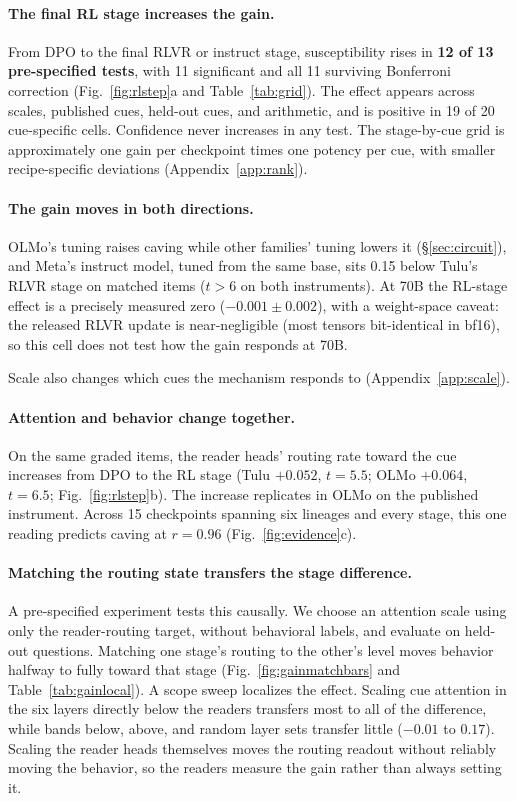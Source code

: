 \documentclass{article}
\begin{document}
\paragraph{The final RL stage increases the gain.} From DPO to the final RLVR or instruct stage, susceptibility rises in \textbf{12 of 13 pre-specified tests}, with 11 significant and all 11 surviving Bonferroni correction (Fig.~\ref{fig:rlstep}a and Table~\ref{tab:grid}). The effect appears across scales, published cues, held-out cues, and arithmetic, and is positive in 19 of 20 cue-specific cells. Confidence never increases in any test. The stage-by-cue grid is approximately one gain per checkpoint times one potency per cue, with smaller recipe-specific deviations (Appendix~\ref{app:rank}).

\paragraph{The gain moves in both directions.} OLMo's tuning raises caving while other families' tuning lowers it (\S\ref{sec:circuit}), and Meta's instruct model, tuned from the same base, sits 0.15 below Tulu's RLVR stage on matched items ($t>6$ on both instruments). At 70B the RL-stage effect is a precisely measured zero ($-0.001\pm0.002$), with a weight-space caveat: the released RLVR update is near-negligible (most tensors bit-identical in bf16), so this cell does not test how the gain responds at 70B.

Scale also changes which cues the mechanism responds to (Appendix~\ref{app:scale}).

\paragraph{Attention and behavior change together.} On the same graded items, the reader heads' routing rate toward the cue increases from DPO to the RL stage (Tulu $+0.052$, $t=5.5$; OLMo $+0.064$, $t=6.5$; Fig.~\ref{fig:rlstep}b). The increase replicates in OLMo on the published instrument. Across 15 checkpoints spanning six lineages and every stage, this one reading predicts caving at $r=0.96$ (Fig.~\ref{fig:evidence}c).

\paragraph{Matching the routing state transfers the stage difference.} A pre-specified experiment tests this causally. We choose an attention scale using only the reader-routing target, without behavioral labels, and evaluate on held-out questions. Matching one stage's routing to the other's level moves behavior halfway to fully toward that stage (Fig.~\ref{fig:gainmatchbars} and Table~\ref{tab:gainlocal}). A scope sweep localizes the effect. Scaling cue attention in the six layers directly below the readers transfers most to all of the difference, while bands below, above, and random layer sets transfer little ($-0.01$ to $0.17$). Scaling the reader heads themselves moves the routing readout without reliably moving the behavior, so the readers measure the gain rather than always setting it.
\end{document}
